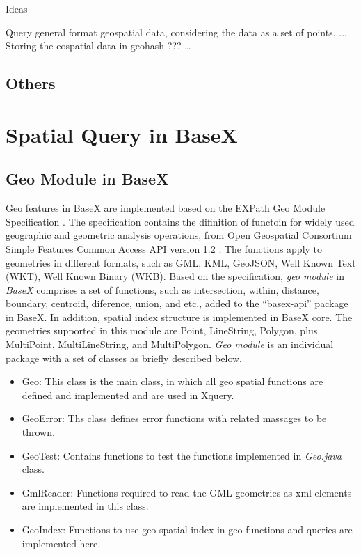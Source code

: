 \documentclass[a4paper,12pt]{article}
\begin{document}
Ideas

Query general format geospatial data, considering the data as a set of points, ...
Storing the eospatial data in geohash ???
…


\subsection{Others}
\newpage

















\section{Spatial Query in BaseX}
\label{s.basex}
\subsection{Geo Module in BaseX}
Geo features in BaseX are implemented based on the EXPath Geo Module Specification \cite{expath}. The specification contains the difinition of functoin for widely used geographic and geometric analysis operations, from Open Geospatial Consortium Simple Features Common Access API version 1.2 \cite{simpleFeature}. The functions apply to geometries in different formats, such as GML, KML, GeoJSON, Well Known Text (WKT), Well Known Binary (WKB). Based on the specification, \textit{geo module} in \textit{BaseX} comprises a set of functions, such as intersection, within, distance, boundary, centroid, diference, union, and etc., added to the “basex-api” package in BaseX. In addition, spatial index structure is implemented in BaseX core. The geometries supported in this module are Point, LineString, Polygon, plus MultiPoint, MultiLineString, and MultiPolygon. \textit{Geo module} is an individual package with a set of classes as briefly described below,
\begin{itemize}
\item Geo: This class is the main class, in which all geo spatial functions are defined and implemented and are used in Xquery.
\item GeoError: Ths class defines error functions with related massages to be thrown.
\item GeoTest: Contains functions to test the functions implemented in \textit{Geo.java} class.
\item GmlReader: Functions required to read the GML geometries as xml elements are implemented in this class.
\item GeoIndex: Functions to use geo spatial index in geo functions and queries are implemented here. 
\end{itemize}
\end{document}
